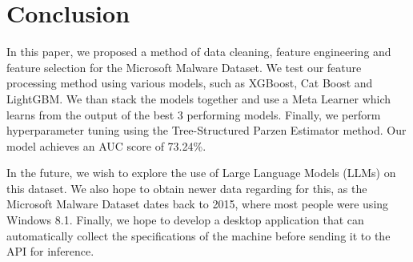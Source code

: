 \documentclass[pdflatex,sn-basic,Numbered]{sn-jnl}%
\theoremstyle{thmstyleone}%
\theoremstyle{thmstyletwo}%
\theoremstyle{thmstylethree}%
\begin{document}
\section{Conclusion}\label{sec:conclusion}
In this paper, we proposed a method of data cleaning, feature engineering and feature selection for the Microsoft Malware Dataset.
We test our feature processing method using various models, such as XGBoost, Cat Boost and LightGBM. We than stack the models together and use a Meta Learner which learns from the output of the best 3 performing models.
Finally, we perform hyperparameter tuning using the Tree-Structured Parzen Estimator method.
Our model achieves an AUC score of 73.24\%.

In the future, we wish to explore the use of Large Language Models (LLMs) on this dataset.
We also hope to obtain newer data regarding for this, as the Microsoft Malware Dataset dates back to 2015, where most people were using Windows 8.1. Finally, we hope to develop a desktop application that can automatically collect the specifications of the machine before sending it to the API for inference.


% 

\end{document}
